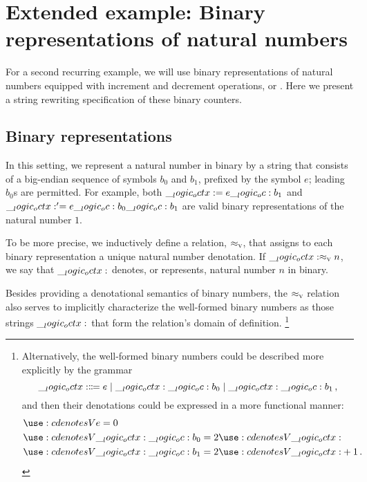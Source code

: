 \section{Extended example: Binary representations of natural numbers}\label{sec:string-rewriting:binary-counter}

For a second recurring example, we will use
binary representations of natural numbers equipped with increment and decrement operations, or .
Here we present a string rewriting specification of these binary counters.

\subsection{Binary representations}

In this setting, we represent a natural number in binary by a string that consists of a big-endian sequence of symbols $b_0$ and $b_1$, prefixed by the symbol $e$; leading $b_0$s are permitted.
For example, both $\__logic_octx: = e \__logic_oc: b_1$ and $\__logic_octx:' = e \__logic_oc: b_0 \__logic_oc: b_1$ are valid binary representations of the natural number $1$.

To be more precise, we inductively define a relation, $ \approx\sb{\text{\normalfont\scshape v}} $, that assigns to each binary representation a unique natural number denotation.
If $\__logic_octx: \approx\sb{\text{\normalfont\scshape v}} n$, we say that $\__logic_octx:$ denotes, or represents, natural number $n$ in binary.
Besides providing a denotational semantics of binary numbers, the $ \approx\sb{\text{\normalfont\scshape v}} $ relation also serves to implicitly characterize the well-formed binary numbers as those strings $\__logic_octx:$ that form the relation's domain of definition.%
\footnote{Alternatively, the well-formed binary numbers could be described more explicitly by the grammar
\begin{equation*}
  \__logic_octx: \Coloneqq e \mid \__logic_octx: \__logic_oc: b_0 \mid \__logic_octx: \__logic_oc: b_1
  \,,
\end{equation*}
and then their denotations could be expressed in a more functional manner:
\begin{equation*}
  \begin{lgathered}
    \deno[V]{e} = 0 \\
    \deno[V]{\octx \oc b_0} = 2 \deno[V]{\octx} \\
    \deno[V]{\octx \oc b_1} = 2 \deno[V]{\octx} + 1
    \,.
  \end{lgathered}
\end{equation*}%
}


